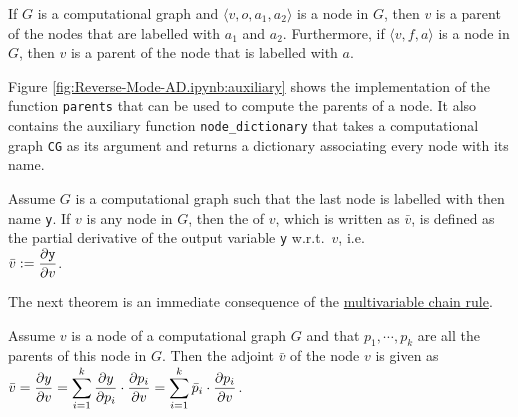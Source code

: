 \begin{Definition}[Parent]
  If $G$ is a computational graph and $\langle v, o, a_1, a_2\rangle$ is a node in $G$, then $v$ is a parent
  of the nodes that are labelled with $a_1$ and $a_2$.  Furthermore, if $\langle v, f, a\rangle$ is a node in
  $G$, then $v$ is a parent of the node that is labelled with $a$.
  \eoxs
\end{Definition}

Figure \ref{fig:Reverse-Mode-AD.ipynb:auxiliary} shows the implementation of the function \texttt{parents}
that can be used to compute the parents of a node.  It also contains the auxiliary function
\texttt{node\_dictionary} that takes a computational graph \texttt{CG} as its argument and returns a dictionary
associating every node with its name.
\FloatBarrier

\begin{Definition}[Adjoint]
  Assume $G$ is a computational graph such that the last node is labelled with then name \texttt{y}.
  If $v$ is any node in $G$, then the   of $v$, which is written as $\bar{v}$, is defined
  as the partial derivative of the output variable \texttt{y} w.r.t.~$v$, i.e.
  \\[0.2cm]
  \hspace*{1.3cm}
  $\displaystyle\bar{v} := \frac{\partial \mathtt{y}}{\partial v}$.  \eoxs
\end{Definition}

\noindent
The next theorem is an immediate consequence of the 
\href{https://en.wikipedia.org/wiki/Chain_rule#Multivariable_case}{multivariable chain rule}.

\begin{Theorem}
  Assume $v$ is a node of a computational graph $G$ and that $p_1, \cdots, p_k$ are all the parents of this node
  in $G$. Then the adjoint $\bar{v}$ of the node $v$
  is given as
  \\[0.2cm]
  \hspace*{1.3cm}
  $\displaystyle\bar{v} = \frac{\partial y}{\partial v} 
              = \sum\limits_{i=1}^k \frac{\partial y}{\partial p_i} \cdot \frac{\partial p_i}{\partial v}
              = \sum\limits_{i=1}^k \bar{p}_i \cdot \frac{\partial p_i}{\partial v}
  $.
\end{Theorem}

